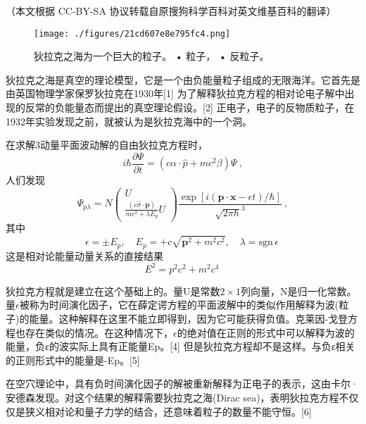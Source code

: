 
（本文根据 CC-BY-SA 协议转载自原搜狗科学百科对英文维基百科的翻译）

\begin{figure}[ht]
\centering
\texttt{[image: ./figures/21cd607e8e795fc4.png]}
\caption{狄拉克之海为一个巨大的粒子。 • 粒子， • 反粒子。} \label{fig_DLKZH_1}
\end{figure}

狄拉克之海是真空的理论模型，它是一个由负能量粒子组成的无限海洋。它首先是由英国物理学家保罗狄拉克在1930年[1] 为了解释狄拉克方程的相对论电子解中出现的反常的负能量态而提出的真空理论假设。[2] 正电子，电子的反物质粒子，在1932年实验发现之前，就被认为是狄拉克海中的一个洞。

在求解3动量平面波动解的自由狄拉克方程时，
$$i \hbar \frac{\partial \Psi}{\partial t} = (c \alpha \cdot \hat{p} + mc^2 \beta) \Psi~,$$
人们发现
$$\Psi_{p \lambda} = N \left( \begin{array}{c}    U \\    \frac{(c \hat{\sigma} \cdot \mathbf{p})}{mc^2 + \lambda E_p} U \end{array} \right)\frac{\exp\left[ i ( \mathbf{p} \cdot \mathbf{x} - \epsilon t ) / \hbar \right]}{\sqrt{2 \pi \hbar}^3}~,$$
其中
$$\epsilon = \pm E_p, \quad E_p = +c \sqrt{\mathbf{p}^2 + m^2 c^2}, \quad \lambda = \text{sgn} \, \epsilon~$$
这是相对论能量动量关系的直接结果
$$E^2 = p^2 c^2 + m^2 c^4~$$

狄拉克方程就是建立在这个基础上的。量U是常数$2\times1$列向量，N是归一化常数。量$\epsilon$被称为时间演化因子，它在薛定谔方程的平面波解中的类似作用解释为波(粒子)的能量。这种解释在这里不能立即得到，因为它可能获得负值。克莱因-戈登方程也存在类似的情况。在这种情况下，$\epsilon$的绝对值在正则的形式中可以解释为波的能量，负ε的波实际上具有正能量Ep。[4] 但是狄拉克方程却不是这样。与负ε相关的正则形式中的能量是-Ep。[5]

在空穴理论中，具有负时间演化因子的解被重新解释为正电子的表示，这由卡尔·安德森发现。对这个结果的解释需要狄拉克之海(Dirac sea)，表明狄拉克方程不仅仅是狭义相对论和量子力学的结合，还意味着粒子的数量不能守恒。[6]


